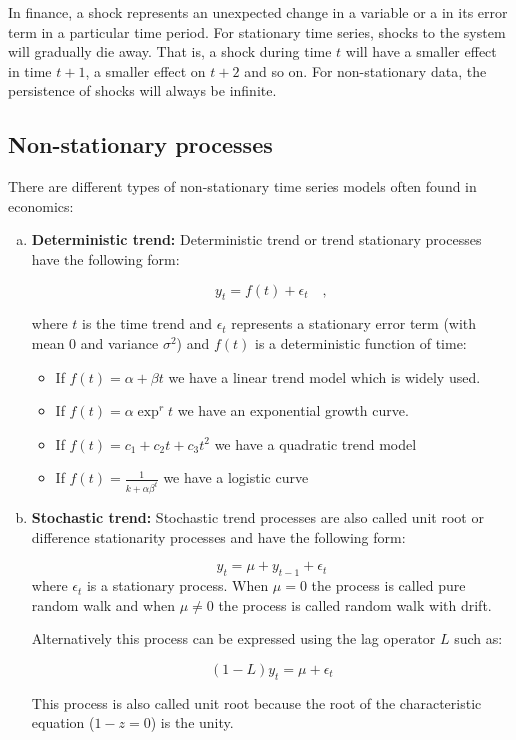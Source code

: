 In finance, a shock represents an unexpected change in a variable or a in its
error term in a particular time period. For stationary time series, shocks to
the system will gradually die away. That is, a shock during time $t$ will have a
smaller effect in time $t+1$, a smaller effect on $t+2$ and so on. For
non-stationary data, the persistence of shocks will always be infinite. 

\subsection{Non-stationary processes}

There are different types of non-stationary time series models often found in economics:

\begin{enumerate}[(a)]
\item \textbf{Deterministic trend:} Deterministic trend or trend stationary processes have the following form:

\[
y_t = f(t) + \epsilon_{t} \quad ,
\]

\noindent where $t$ is the time trend and $\epsilon_{t}$ represents a stationary error term (with mean 0 and variance $\sigma^2$) and $f(t)$ is a deterministic function of time:
\begin{itemize}
\item If $f(t) = \alpha + \beta t$ we have a linear trend model which is widely used. 
\item If $f(t)= \alpha \exp^rt$ we have an exponential growth curve.
\item If $f(t) = c_1 + c_2t + c_3 t^2$ we have a quadratic trend model
\item If $f(t) = \frac{1}{k+\alpha \beta ^t }$ we have a logistic curve
\end{itemize}
\item \textbf{Stochastic trend:} Stochastic trend processes are also called unit root or difference stationarity processes and have the following form:

\[
y_t = \mu + y_{t-1} + \epsilon_t
\]
\noindent where $\epsilon_t$ is a stationary process. When $\mu = 0 $ the process is called pure random walk and when $\mu \neq 0$  the process is called random walk with drift.

Alternatively this process can be expressed using the lag operator $L$ such as:

\[
(1-L) y_t = \mu  + \epsilon_t
\]

This process is also called unit root because the root of the characteristic equation ($1-z = 0$) is the unity.  


\end{enumerate}

